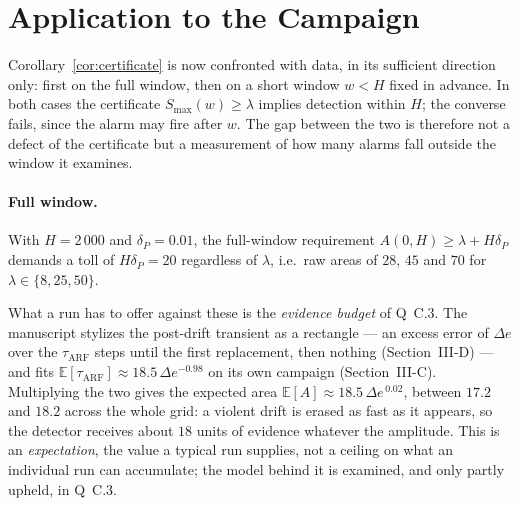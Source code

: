 \documentclass[10pt,a4paper]{article}
\begin{document}
\section{Application to the Campaign}
\label{sec:application}

Corollary~\ref{cor:certificate} is now confronted with data, in its sufficient
direction only: first on the full window, then on a short window $w < H$ fixed in
advance. In both cases the certificate $S_{\max}(w) \ge \lambda$ implies detection
within $H$; the converse fails, since the alarm may fire after $w$. The gap between the
two is therefore not a defect of the certificate but a measurement of how many alarms
fall outside the window it examines.

\paragraph{Full window.} With $H = 2\,000$ and $\delta_P = 0.01$, the full-window
requirement $A(0,H) \ge \lambda + H\delta_P$ demands a toll of $H\delta_P = 20$
regardless of $\lambda$, i.e.\ raw areas of $28$, $45$ and $70$ for
$\lambda \in \{8,25,50\}$.

What a run has to offer against these is the \emph{evidence budget} of Q~C.3. The
manuscript stylizes the post-drift transient as a rectangle --- an excess error of
$\Delta e$ over the $\tau_{\mathrm{ARF}}$ steps until the first replacement, then
nothing (Section~III-D) --- and fits
$\mathbb{E}[\tau_{\mathrm{ARF}}] \approx 18.5\,\Delta e^{-0.98}$ on its own campaign
(Section~III-C). Multiplying the two gives the expected area
$\mathbb{E}[A] \approx 18.5\,\Delta e^{\,0.02}$, between $17.2$ and $18.2$ across the
whole grid: a violent drift is erased as fast as it appears, so the detector receives
about $18$ units of evidence whatever the amplitude. This is an \emph{expectation}, the
value a typical run supplies, not a ceiling on what an individual run can accumulate;
the model behind it is examined, and only partly upheld, in Q~C.3.
\end{document}
